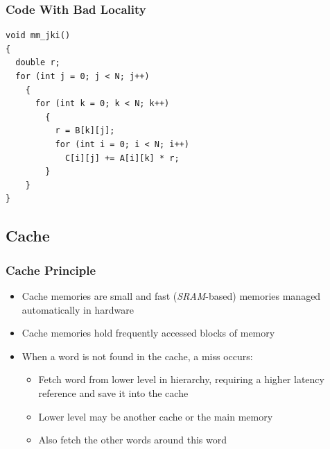 \documentclass{beamer}
\begin{document}
\begin{frame}[fragile]
\frametitle{Code With Bad Locality}

\scriptsize

\begin{lstlisting}[linebackgroundcolor={\lstcolorlines{10}}]
void mm_jki()
{
  double r;
  for (int j = 0; j < N; j++)
    {
      for (int k = 0; k < N; k++)
        {
          r = B[k][j];
          for (int i = 0; i < N; i++)
            C[i][j] += A[i][k] * r;
        }
    }
}
\end{lstlisting}


\end{frame}

\subsection{Cache}

\begin{frame}%
\frametitle{Cache Principle}

\begin{itemize}

\item Cache memories are small and fast (\emph{SRAM}-based) memories managed automatically in hardware

  \vspace{0.5cm}

\item Cache memories hold frequently accessed blocks of memory

  \vspace{0.5cm}

\item When a word is not found in the cache, a miss occurs:
  \begin{itemize}
  \item Fetch word from lower level in hierarchy, requiring a higher latency reference and save it into the cache
      \vspace{0.2cm}
    \item Lower level may be another cache or the main memory
        \vspace{0.2cm}
      \item Also fetch the other words around this word
  \end{itemize}

\end{itemize}

\end{frame}
\end{document}
